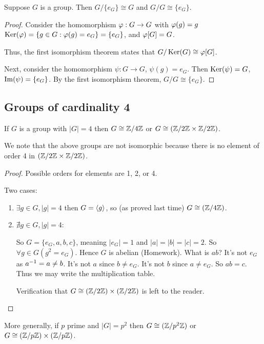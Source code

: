 \documentclass[notes.tex]{subfiles}
\begin{document}

\begin{proposition}
	Suppose $G$ is a group. Then $G/\{e_G\}\cong G$ and $G/G \cong \{e_G\}$.
\end{proposition}

\begin{proof}
	Consider the homomorphism $\varphi:G\to G$ with $\varphi(g) = g$ 
	$\operatorname{\mathrm{Ker}}(\varphi) = \{g\in G : \varphi(g) = e_G\} = \{e_G\}$, and $\varphi[G] = G$.

	Thus, the first isomorphism theorem states that $G/\operatorname{\mathrm{Ker}}(G)\cong \varphi[G]$.

	Next, consider the homomorphism $\psi:G\to G$, $\psi(g) = e_G$.
	Then $\operatorname{\mathrm{Ker}}(\psi) = G$, $\operatorname{\mathrm{Im}}(\psi) = \{e_G\}$. By the first isomorphism theorem, $G/G \cong \{e_G\}$.
\end{proof}

\subsection*{Groups of cardinality 4}

\begin{proposition}
	If $G$ is a group with $|G| = 4$ then $G \cong \mathbb{Z}/4\mathbb{Z}$ or $G\cong (\mathbb{Z}/2\mathbb{Z} \times \mathbb{Z}/2\mathbb{Z})$.
\end{proposition}
We note that the above groups are not isomorphic because there is no element of order 4 in $(\mathbb{Z}/2\mathbb{Z} \times \mathbb{Z}/2\mathbb{Z})$.

\begin{proof}
	Possible orders for elements are 1, 2, or 4.

	Two cases:
	\begin{enumerate}
		\item
		$\exists g \in G, |g| = 4$
		then $G = \left\langle{g}\right\rangle$, so (as proved last time) $G\cong(\mathbb{Z}/{4}\mathbb{Z})$.
		\item
		$\nexists g\in G, |g| = 4$: 

		So $G = \{e_G, a, b,c \}$, meaning
		$|e_G| = 1$ and $|a| = |b| = |c| = 2$.
		So $\forall g\in G(g^2 = e_G)$. Hence $G$ is abelian (Homework).
		What is $ab$? It's not $e_G$ as ${a}^{-1} = a \ne b$.
		It's not $a$ since $b \ne e_G$. It's not $b$ since $a \ne e_G$.
		So $ab = c$.
		Thus we may write the multiplication table. 

		Verification that $G\cong (\mathbb{Z}/{2}\mathbb{Z})\times(\mathbb{Z}/{2}\mathbb{Z})$ is left to the reader.
	\end{enumerate}
\end{proof}

\begin{remark}
	More generally, if $p$ prime and $|G| = p^2$ then $G\cong (\mathbb{Z}/{p^2}\mathbb{Z})$ or $G\cong (\mathbb{Z}/{p}\mathbb{Z})\times(\mathbb{Z}/{p}\mathbb{Z})$.
\end{remark}
\end{document}
